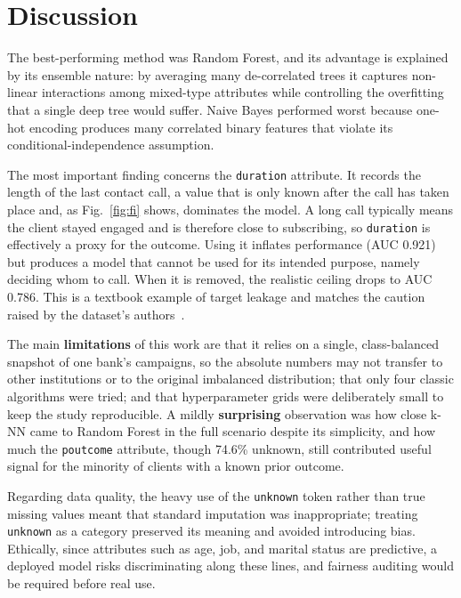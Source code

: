 \documentclass[conference]{IEEEtran}
\begin{document}
	\section{Discussion}
	\label{sec:discussion}

	The best-performing method was Random Forest, and its advantage is explained by
	its ensemble nature: by averaging many de-correlated trees it captures
	non-linear interactions among mixed-type attributes while controlling the
	overfitting that a single deep tree would suffer. Naive Bayes performed worst
	because one-hot encoding produces many correlated binary features that violate
	its conditional-independence assumption.

	The most important finding concerns the \texttt{duration} attribute. It records
	the length of the last contact call, a value that is only known after the call
	has taken place and, as Fig.~\ref{fig:fi} shows, dominates the model. A long
	call typically means the client stayed engaged and is therefore close to
	subscribing, so \texttt{duration} is effectively a proxy for the outcome. Using
	it inflates performance (AUC 0.921) but produces a model that cannot be used
	for its intended purpose, namely deciding whom to call. When it is removed, the
	realistic ceiling drops to AUC 0.786. This is a textbook example of target
	leakage and matches the caution raised by the dataset's authors~\cite{b_moro}.

	The main \textbf{limitations} of this work are that it relies on a single,
	class-balanced snapshot of one bank's campaigns, so the absolute numbers may
	not transfer to other institutions or to the original imbalanced distribution;
	that only four classic algorithms were tried; and that hyperparameter grids
	were deliberately small to keep the study reproducible. A mildly
	\textbf{surprising} observation was how close k-NN came to Random Forest in the
	full scenario despite its simplicity, and how much the \texttt{poutcome}
	attribute, though 74.6\% unknown, still contributed useful signal for the
	minority of clients with a known prior outcome.

	Regarding data quality, the heavy use of the \texttt{unknown} token rather than
	true missing values meant that standard imputation was inappropriate; treating
	\texttt{unknown} as a category preserved its meaning and avoided introducing
	bias. Ethically, since attributes such as age, job, and marital status are
	predictive, a deployed model risks discriminating along these lines, and
	fairness auditing would be required before real use.
\end{document}
